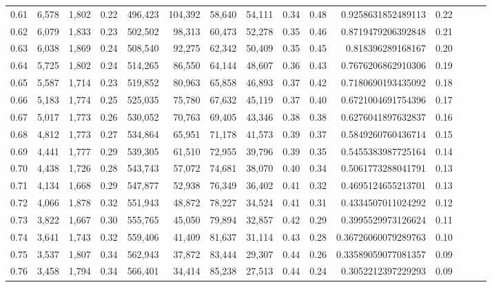\begin{tabular}{rrrrrrrrrrrrrrr}
0.61 &   6,578 &  1,802 &  0.22 &  496,423 &  104,392 &   58,640 &   54,111 &  0.34 &  0.48 &     0.9258631852489113 &      0.22 \\
0.62 &   6,079 &  1,833 &  0.23 &  502,502 &   98,313 &   60,473 &   52,278 &  0.35 &  0.46 &     0.8719479206392848 &      0.21 \\
0.63 &   6,038 &  1,869 &  0.24 &  508,540 &   92,275 &   62,342 &   50,409 &  0.35 &  0.45 &      0.818396289168167 &      0.20 \\
0.64 &   5,725 &  1,802 &  0.24 &  514,265 &   86,550 &   64,144 &   48,607 &  0.36 &  0.43 &     0.7676206862910306 &      0.19 \\
0.65 &   5,587 &  1,714 &  0.23 &  519,852 &   80,963 &   65,858 &   46,893 &  0.37 &  0.42 &     0.7180690193435092 &      0.18 \\
0.66 &   5,183 &  1,774 &  0.25 &  525,035 &   75,780 &   67,632 &   45,119 &  0.37 &  0.40 &     0.6721004691754396 &      0.17 \\
0.67 &   5,017 &  1,773 &  0.26 &  530,052 &   70,763 &   69,405 &   43,346 &  0.38 &  0.38 &     0.6276041897632837 &      0.16 \\
0.68 &   4,812 &  1,773 &  0.27 &  534,864 &   65,951 &   71,178 &   41,573 &  0.39 &  0.37 &     0.5849260760436714 &      0.15 \\
0.69 &   4,441 &  1,777 &  0.29 &  539,305 &   61,510 &   72,955 &   39,796 &  0.39 &  0.35 &     0.5455383987725164 &      0.14 \\
0.70 &   4,438 &  1,726 &  0.28 &  543,743 &   57,072 &   74,681 &   38,070 &  0.40 &  0.34 &     0.5061773288041791 &      0.13 \\
0.71 &   4,134 &  1,668 &  0.29 &  547,877 &   52,938 &   76,349 &   36,402 &  0.41 &  0.32 &     0.4695124655213701 &      0.13 \\
0.72 &   4,066 &  1,878 &  0.32 &  551,943 &   48,872 &   78,227 &   34,524 &  0.41 &  0.31 &     0.4334507011024292 &      0.12 \\
0.73 &   3,822 &  1,667 &  0.30 &  555,765 &   45,050 &   79,894 &   32,857 &  0.42 &  0.29 &     0.3995529973126624 &      0.11 \\
0.74 &   3,641 &  1,743 &  0.32 &  559,406 &   41,409 &   81,637 &   31,114 &  0.43 &  0.28 &    0.36726060079289763 &      0.10 \\
0.75 &   3,537 &  1,807 &  0.34 &  562,943 &   37,872 &   83,444 &   29,307 &  0.44 &  0.26 &    0.33589059077081357 &      0.09 \\
0.76 &   3,458 &  1,794 &  0.34 &  566,401 &   34,414 &   85,238 &   27,513 &  0.44 &  0.24 &     0.3052212397229293 &      0.09 \\

\end{tabular}

